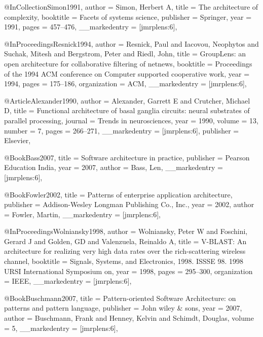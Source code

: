{{{@InCollection{Simon1991,
  author        = {Simon, Herbert A},
  title         = {The architecture of complexity},
  booktitle     = {Facets of systems science},
  publisher     = {Springer},
  year          = {1991},
  pages         = {457--476},
  __markedentry = {[jmrplens:6]},
}

@InProceedings{Resnick1994,
  author        = {Resnick, Paul and Iacovou, Neophytos and Suchak, Mitesh and Bergstrom, Peter and Riedl, John},
  title         = {GroupLens: an open architecture for collaborative filtering of netnews},
  booktitle     = {Proceedings of the 1994 ACM conference on Computer supported cooperative work},
  year          = {1994},
  pages         = {175--186},
  organization  = {ACM},
  __markedentry = {[jmrplens:6]},
}

@Article{Alexander1990,
  author        = {Alexander, Garrett E and Crutcher, Michael D},
  title         = {Functional architecture of basal ganglia circuits: neural substrates of parallel processing},
  journal       = {Trends in neurosciences},
  year          = {1990},
  volume        = {13},
  number        = {7},
  pages         = {266--271},
  __markedentry = {[jmrplens:6]},
  publisher     = {Elsevier},
}

@Book{Bass2007,
  title         = {Software architecture in practice},
  publisher     = {Pearson Education India},
  year          = {2007},
  author        = {Bass, Len},
  __markedentry = {[jmrplens:6]},
}

@Book{Fowler2002,
  title         = {Patterns of enterprise application architecture},
  publisher     = {Addison-Wesley Longman Publishing Co., Inc.},
  year          = {2002},
  author        = {Fowler, Martin},
  __markedentry = {[jmrplens:6]},
}

@InProceedings{Wolniansky1998,
  author        = {Wolniansky, Peter W and Foschini, Gerard J and Golden, GD and Valenzuela, Reinaldo A},
  title         = {V-BLAST: An architecture for realizing very high data rates over the rich-scattering wireless channel},
  booktitle     = {Signals, Systems, and Electronics, 1998. ISSSE 98. 1998 URSI International Symposium on},
  year          = {1998},
  pages         = {295--300},
  organization  = {IEEE},
  __markedentry = {[jmrplens:6]},
}

@Book{Buschmann2007,
  title         = {Pattern-oriented Software Architecture: on patterns and pattern language},
  publisher     = {John wiley \& sons},
  year          = {2007},
  author        = {Buschmann, Frank and Henney, Kelvin and Schimdt, Douglas},
  volume        = {5},
  __markedentry = {[jmrplens:6]},
}

}}}
